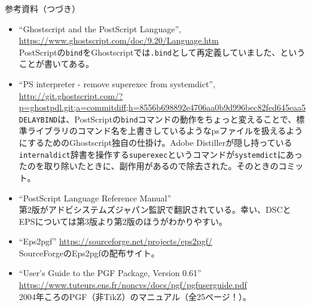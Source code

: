 \documentclass[14pt,dvipdfmx,uplatex]{beamer}
\begin{document}
\begin{frame}[t]{\inhibitglue 参考資料（つづき）}
  \sffamily
  \fontsize{9pt}{9pt}\selectfont

  \begin{itemize}
    \item ``Ghostscript and the PostScript Language'', \url{https://www.ghostscript.com/doc/9.20/Language.htm}\\
     PostScriptの\texttt{bind}をGhostscriptでは\texttt{.bind}として再定義していました、ということが書いてある。
    \item ``PS interpreter - remove superexec from systemdict'', \url{http://git.ghostscript.com/?p=ghostpdl.git;a=commitdiff;h=8556b698892e4706aa0b9d996bec82fed645eaa5}\\
    \texttt{DELAYBIND}は、PostScriptの\texttt{bind}コマンドの動作をちょっと変えることで、標準ライブラリのコマンド名を上書きしているようなpsファイルを扱えるようにするためのGhostscript独自の仕掛け。Adobe Distillerが隠し持っている\texttt{internaldict}辞書を操作する\texttt{superexec}というコマンドが\texttt{systemdict}にあったのを取り除いたときに、副作用があるので除去された。そのときのコミット。
    \item ``PostScript Language Reference Manual''\\
    第2版がアドビシステムズジャパン監訳で翻訳されている。幸い、DSCとEPSについては第3版より第2版のほうがわかりやすい。
    \item ``Eps2pgf'' \url{https://sourceforge.net/projects/eps2pgf/}\\
    SourceForgeのEps2pgfの配布サイト。
    \item ``User's Guide to the PGF Package, Version 0.61'' \url{https://www.tuteurs.ens.fr/noncvs/docs/pgf/pgfuserguide.pdf}\\
    2004年ころのPGF（非TikZ）のマニュアル（全25ページ！）。
  \end{itemize}

\end{frame}

%
%
\end{document}
